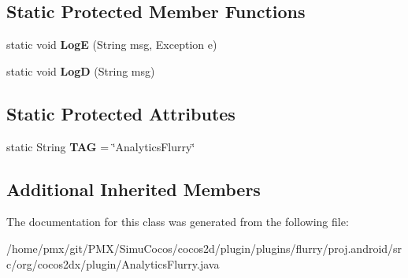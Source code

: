 \subsection*{Static Protected Member Functions}
\begin{DoxyCompactItemize}
\item 
\mbox{\label{classorg_1_1cocos2dx_1_1plugin_1_1AnalyticsFlurry_ac150852bedf9e4e95379eb0bfed7e8c7}} 
static void {\bfseries LogE} (String msg, Exception e)
\item 
\mbox{\label{classorg_1_1cocos2dx_1_1plugin_1_1AnalyticsFlurry_adca56af7d7c2ab831b53e767bc667f7e}} 
static void {\bfseries LogD} (String msg)
\end{DoxyCompactItemize}
\subsection*{Static Protected Attributes}
\begin{DoxyCompactItemize}
\item 
\mbox{\label{classorg_1_1cocos2dx_1_1plugin_1_1AnalyticsFlurry_a499f599bfef1c2d630f978e33ac44d41}} 
static String {\bfseries T\+AG} = \char`\"{}Analytics\+Flurry\char`\"{}
\end{DoxyCompactItemize}
\subsection*{Additional Inherited Members}


The documentation for this class was generated from the following file\+:\begin{DoxyCompactItemize}
\item 
/home/pmx/git/\+P\+M\+X/\+Simu\+Cocos/cocos2d/plugin/plugins/flurry/proj.\+android/src/org/cocos2dx/plugin/Analytics\+Flurry.\+java\end{DoxyCompactItemize}
